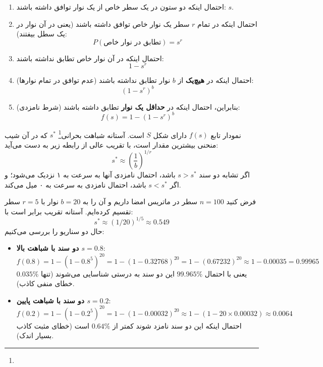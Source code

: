\begin{enumerate}
    \item احتمال اینکه دو ستون در یک سطر خاص از یک نوار توافق داشته باشند: $s$.
    \item احتمال اینکه در تمام $r$ سطر یک نوار خاص توافق داشته باشند (یعنی در آن نوار در یک سطل بیفتند):
    \begin{equation}
    P(\text{تطابق در نوار خاص}) = s^r
    \end{equation}
    \item احتمال اینکه در آن نوار خاص تطابق نداشته باشند:
    \begin{equation}
    1 - s^r
    \end{equation}
    \item احتمال اینکه در \textbf{هیچ‌یک} از $b$ نوار تطابق نداشته باشند (عدم توافق در تمام نوارها):
    \begin{equation}
    (1 - s^r)^b
    \end{equation}
    \item بنابراین، احتمال اینکه در \textbf{حداقل یک نوار} تطابق داشته باشند (شرط نامزدی):
    \begin{equation}
    f(s) = 1 - (1 - s^r)^b
    \end{equation}
\end{enumerate}

نمودار تابع $f(s)$ دارای شکل $S$ است. آستانه شباهت بحرانی\footnote{} $s^*$ که در آن شیب منحنی بیشترین مقدار است، با تقریب عالی از رابطه زیر به دست می‌آید:
\begin{equation}
s^* \approx \left( \frac{1}{b} \right)^{1/r}
\end{equation}
اگر تشابه دو سند $s > s^*$ باشد، احتمال نامزدی آنها به سرعت به ۱ نزدیک می‌شود؛ و اگر $s < s^*$ باشد، احتمال نامزدی به سرعت به ۰ میل می‌کند.

\begin{example}
فرض کنید $n = 100$ سطر در ماتریس امضا داریم و آن را به $b = 20$ نوار با $r = 5$ سطر تقسیم کرده‌ایم. آستانه تقریب برابر است با:
\begin{equation}
s^* \approx (1/20)^{1/5} \approx 0.549
\end{equation}
حال دو سناریو را بررسی می‌کنیم:
\begin{itemize}
    \item \textbf{دو سند با شباهت بالا $s = 0.8$}:
    \begin{equation}
    f(0.8) = 1 - (1 - 0.8^5)^{20} = 1 - (1 - 0.32768)^{20} = 1 - (0.67232)^{20} \approx 1 - 0.00035 = 0.99965
    \end{equation}
    یعنی با احتمال $99.965\%$ این دو سند به درستی شناسایی می‌شوند (تنها $0.035\%$ خطای منفی کاذب).
    
    \item \textbf{دو سند با شباهت پایین $s = 0.2$}:
    \begin{equation}
    f(0.2) = 1 - (1 - 0.2^5)^{20} = 1 - (1 - 0.00032)^{20} \approx 1 - (1 - 20 \times 0.00032) \approx 0.0064
    \end{equation}
    احتمال اینکه این دو سند نامزد شوند کمتر از $0.64\%$ است (خطای مثبت کاذب بسیار اندک).
\end{itemize}
\end{example}

